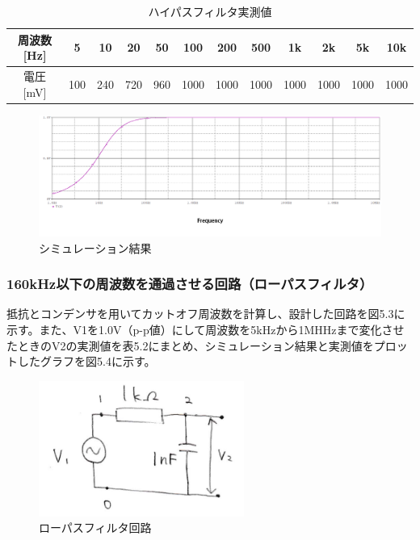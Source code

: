 \documentclass{jlreq}
\numberwithin{equation}{section}
\begin{document}
\begin{table}[H]
  \centering
  \caption{ハイパスフィルタ実測値}
  \begin{tabular}{|c|c|c|c|c|c|c|c|c|c|c|c|}
    \hline
    周波数 [Hz] & 5 & 10 & 20 & 50 & 100 & 200 & 500 & 1k & 2k & 5k & 10k \\ \hline
    電圧 [mV] & 100 & 240 & 720 & 960 & 1000 & 1000 & 1000 & 1000 & 1000 & 1000 & 1000 \\ \hline
  \end{tabular}
\end{table}

\begin{figure}[H]
  \centering
  \includegraphics[width=\textwidth]{assets/highpass.png}
  \caption{シミュレーション結果}
\end{figure}

\subsubsection{160kHz以下の周波数を通過させる回路（ローパスフィルタ）}
抵抗とコンデンサを用いてカットオフ周波数を計算し、設計した回路を図5.3に示す。また、V1を1.0V（p-p値）にして周波数を5kHzから1MHHzまで変化させたときのV2の実測値を表5.2にまとめ、シミュレーション結果と実測値をプロットしたグラフを図5.4に示す。

\begin{figure}[H]
  \centering
  \includegraphics[width=0.6\textwidth]{assets/lowpasskairo.png}
  \caption{ローパスフィルタ回路}
\end{figure}
\end{document}
